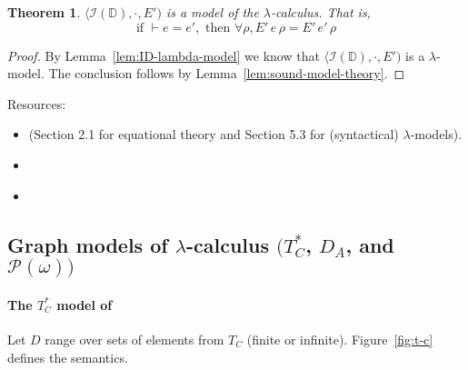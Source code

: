 \documentclass{tufte-handout}
\newtheorem{theorem}{Theorem}%
\begin{document}
\begin{theorem}
$\langle \mathcal{I}(\mathbb{D}), \cdot, E')$ is a model of the 
  $\lambda$-calculus. That is, 
  \[
  \text{if } \vdash e = e', 
  \text{ then } \forall \rho, E'\,e\,\rho = E'\,e'\,\rho
  \]
\end{theorem}
\begin{proof}
  By Lemma~\ref{lem:ID-lambda-model} we know that 
  $\langle \mathcal{I}(\mathbb{D}), \cdot, E')$ is a $\lambda$-model.
  The conclusion follows by Lemma~\ref{lem:sound-model-theory}.
\end{proof}

Resources:
\begin{itemize}
\item \citet{barendregt84:_lambda_calculus} (Section 2.1 for
  equational theory and Section 5.3 for (syntactical) $\lambda$-models).
\item \citet{Alessi:2006aa}
\item \citet{Hindley:1980aa}
\end{itemize}

\subsection{Graph models of $\lambda$-calculus $(T^{*}_C$, $D_A$, and $\mathcal{P}(\omega))$ }
\label{sec:graph-models}



\paragraph{The $T^{*}_C$ model of \citet{Plotkin:1972aa}}
\label{sec:t-c}


\newcommand{\EP}[0]{E_P}
\newcommand{\PSEM}[1]{\EP\,#1\,}

Let $D$ range over sets of elements from $T_C$ (finite or infinite).
Figure~\ref{fig:t-c} defines the semantics.
  
\end{document}
